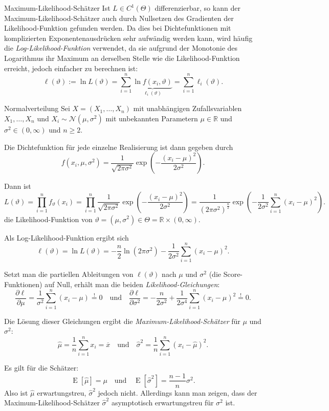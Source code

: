 \begin{defi}{Maximum-Likelihood-Schätzer}
    Ist $L \in C^1(\Theta)$ differenzierbar, so kann der Maximum-Likelihood-Schätzer auch durch Nullsetzen des Gradienten der Likelihood-Funktion gefunden werden.
    Da dies bei Dichtefunktionen mit komplizierten Exponentenausdrücken sehr aufwändig werden kann, wird häufig die \emph{Log-Likelihood-Funktion} verwendet, da sie aufgrund der Monotonie des Logarithmus ihr Maximum an derselben Stelle wie die Likelihood-Funktion erreicht, jedoch einfacher zu berechnen ist:
    \[
        \ell(\vartheta) := \ln L(\vartheta) = \sum_{i=1}^n \underbrace{\ln f(x_i, \vartheta)}_{\ell_i(\vartheta)} = \sum_{i=1}^n \ell_i(\vartheta).
    \]
\end{defi}

\begin{example}{Normalverteilung}
    Sei $X = (X_1, \dotsc, X_n)$ mit unabhängigen Zufallsvariablen $X_1, \dotsc, X_n$ und $X_i \sim \mathcal{N}(\mu, \sigma^2)$ mit unbekannten Parametern $\mu \in \mathbb{R}$ und $\sigma^2 \in (0, \infty)$ und $n \geq 2$.

    Die Dichtefunktion für jede einzelne Realisierung ist dann gegeben durch
    \[
        f(x_i, \mu, \sigma^2) = \frac{1}{\sqrt{2 \pi \sigma^2}} \exp\left( -\frac{(x_i - \mu)^2}{2 \sigma^2} \right).
    \]

    Dann ist
    \[
        L(\vartheta) = \prod_{i=1}^n f_{\vartheta}(x_i) = \prod_{i=1}^n \frac{1}{\sqrt{2 \pi \sigma^2}} \exp\left( -\frac{(x_i - \mu)^2}{2 \sigma^2} \right) = \frac{1}{(2\pi\sigma^2)^{\frac{n}{2}}} \exp\left( -\frac{1}{2\sigma^2} \sum_{i=1}^n (x_i - \mu)^2 \right).
    \]
    die Likelihood-Funktion von $\vartheta = (\mu, \sigma^2) \in \Theta = \mathbb{R} \times (0, \infty)$.

    Als Log-Likelihood-Funktion ergibt sich
    \[
        \ell(\vartheta) = \ln L(\vartheta) = -\frac{n}{2} \ln(2\pi\sigma^2) - \frac{1}{2\sigma^2} \sum_{i=1}^n (x_i - \mu)^2.
    \]

    Setzt man die partiellen Ableitungen von $\ell(\vartheta)$ nach $\mu$ und $\sigma^2$ (die Score-Funktionen) auf Null, erhält man die beiden \emph{Likelihood-Gleichungen}:
    \[
        \frac{\partial \ell}{\partial \mu} = \frac{1}{\sigma^2} \sum_{i=1}^n (x_i - \mu) \stackrel{!}{=} 0 \quad \text{und} \quad \frac{\partial \ell}{\partial \sigma^2} = -\frac{n}{2\sigma^2} + \frac{1}{2\sigma^4} \sum_{i=1}^n (x_i - \mu)^2 \stackrel{!}{=} 0.
    \]

    Die Lösung dieser Gleichungen ergibt die \emph{Maximum-Likelihood-Schätzer} für $\mu$ und $\sigma^2$:
    \[
        \hat{\mu} = \frac{1}{n} \sum_{i=1}^n x_i = \overline{x} \quad \text{und} \quad \hat{\sigma}^2 = \frac{1}{n} \sum_{i=1}^n (x_i - \hat{\mu})^2.
    \]

    Es gilt für die Schätzer:
    \[
        \operatorname{E}[\hat{\mu}] = \mu \quad \text{und} \quad \operatorname{E}[\hat{\sigma}^2] = \frac{n-1}{n} \sigma^2.
    \]
    Also ist $\hat{\mu}$ erwartungstreu, $\hat{\sigma}^2$ jedoch nicht.
    Allerdings kann man zeigen, dass der Maximum-Likelihood-Schätzer $\hat{\sigma}^2$ asymptotisch erwartungstreu für $\sigma^2$ ist.
\end{example}

